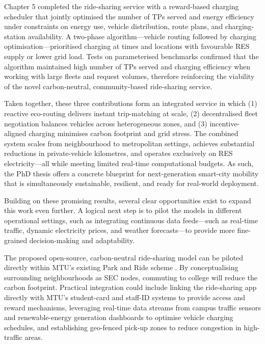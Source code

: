 Chapter 5 completed the ride-sharing service with a reward-based charging scheduler that jointly optimised the number of TPs served and energy efficiency under constraints on energy use, vehicle distribution, route plans, and charging-station availability. A two-phase algorithm—vehicle routing followed by charging optimisation—prioritised charging at times and locations with favourable RES supply or lower grid load. Tests on parameterised benchmarks confirmed that the algorithm maintained high number of TPs served and charging efficiency when working with large fleets and request volumes, therefore reinforcing the viability of the novel carbon-neutral, community-based ride-sharing service.

Taken together, these three contributions form an integrated service in which (1) reactive eco-routing delivers instant trip-matching at scale, (2) decentralised fleet negotiation balances vehicles across heterogeneous zones, and (3) incentive-aligned charging minimises carbon footprint and grid stress. The combined system scales from neighbourhood to metropolitan settings, achieves substantial reductions in private-vehicle kilometres, and operates exclusively on RES electricity—all while meeting limited real-time computational budgets. As such, the PhD thesis offers a concrete blueprint for next-generation smart-city mobility that is simultaneously sustainable, resilient, and ready for real-world deployment.

Building on these promising results, several clear opportunities exist to expand this work even further. A logical next step is to pilot the models in different operational settings, such as integrating continuous data feeds—such as real-time traffic, dynamic electricity prices, and weather forecasts—to provide more fine-grained decision-making and adaptability. 

The proposed open-source, carbon-neutral ride-sharing model can be piloted directly within MTU’s existing Park and Ride scheme \cite{mtu2024parkride}. By conceptualising surrounding neighbourhoods as SEC nodes, commuting to college will reduce the carbon footprint. Practical integration could include linking the ride-sharing app directly with MTU’s student-card and staff-ID systems to provide access and reward mechanisms, leveraging real-time data streams from campus traffic sensors and renewable-energy generation dashboards to optimise vehicle charging schedules, and establishing geo-fenced pick-up zones to reduce congestion in high-traffic areas.

